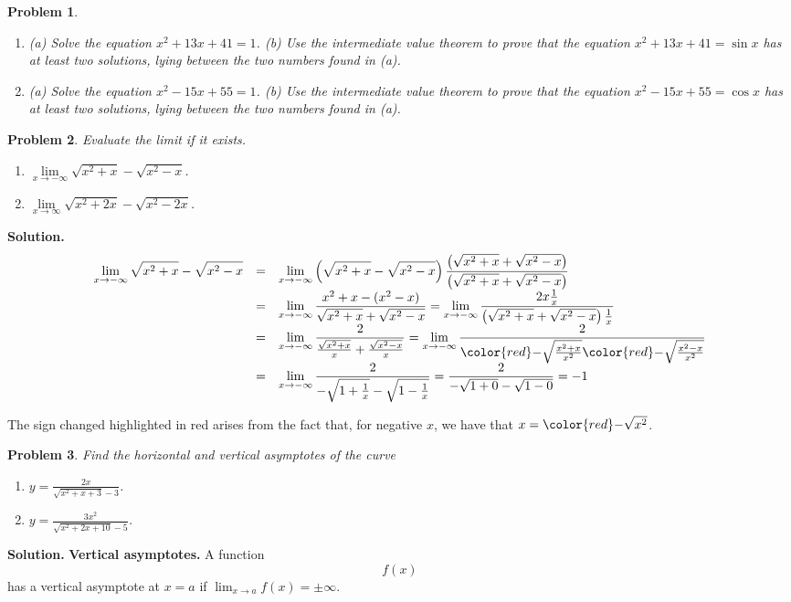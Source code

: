 \documentclass{article}
\newtheorem{problem}{Problem}
\begin{document}
\begin{problem}~
\begin{enumerate}
\item (a) Solve the equation $x^2+13x+41=1$.  (b) Use the intermediate value theorem to prove that the equation $x^2+13x+41=\sin  x$ has at least two solutions, lying between the two numbers found in (a).
\item (a) Solve the equation $x^2-15x+55=1$.  (b) Use the intermediate value theorem to prove that the equation $x^2-15x+55=\cos  x$ has at least two solutions, lying between the two numbers found in (a).
\end{enumerate}
\end{problem}
\begin{problem}
Evaluate the limit if it exists.
\begin{enumerate}
\item $\lim\limits_{x\to-\infty}\sqrt{x^2+x}-\sqrt{x^2-x}$. 
\item $\lim\limits_{x\to\infty}\sqrt{x^2+2x}-\sqrt{x^2-2x} $. 
\end{enumerate}
\end{problem}
\textbf{Solution. }
\[ \begin{array}{rcl}
\displaystyle\lim_{x\to -\infty} \sqrt{x^2+x}-\sqrt{x^2-x} &=&\displaystyle\lim_{x\to -\infty} \left(\sqrt{x^2+x}-\sqrt{x^2-x}\right) \frac{ \left(\sqrt{x^2+x}+\sqrt{x^2-x}\right) }{\left( \sqrt{x^2+x}+\sqrt{x^2-x}\right)}
\\
&=&\displaystyle \lim_{x\to -\infty} \frac{x^2+x-(x^2-x) }{\sqrt{x^2+x}+\sqrt{x^2-x} } = \lim_{x\to -\infty} \frac{2x \frac{1}{x} }{\left(\sqrt{x^2+x}+\sqrt{x^2-x} \right)\frac{1}{x}} 
\\&=&\displaystyle \lim_{x\to -\infty} \frac{2}{\frac{\sqrt{x^2+x}}x+\frac{\sqrt{x^2-x}}x }= \lim_{x\to -\infty} \frac{2}{ {\color{red}-} \sqrt{\frac{x^2+x}{x^2}} {\color{red}-} \sqrt{\frac{x^2-x}{x^2}} }\\
&=&\displaystyle \lim_{x\to -\infty} \frac{2}{ - \sqrt{1+\frac1x} - \sqrt{1-\frac1x} }=\frac{2}{-\sqrt{1+0}-\sqrt{1-0}}=-1
\end{array}
\]


The sign changed highlighted in red arises from the fact that, for negative $x$, we have that $ x={\color{red}-}\sqrt{x^2}$.
\begin{problem}
Find the horizontal and vertical asymptotes of the curve
\begin{enumerate}
\item $y=\frac{2x}{\sqrt{x^2+x+3}-3}$. 
\item $y=\frac{3x^2}{\sqrt{x^2+2x+10}-5}$. 
\end{enumerate}
\end{problem}
\textbf{Solution. } 
\textbf{Vertical asymptotes.} A function $$f(x)$$ has a vertical asymptote at $x=a$ if $\lim_{x\to a} f(x)=\pm \infty$. 
\end{document}
